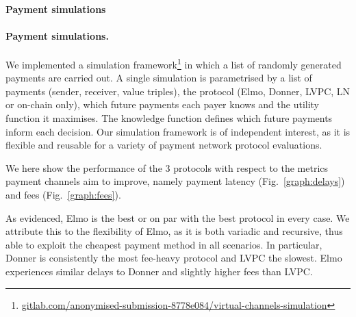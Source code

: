   \makeatletter%
    {\paragraph{Payment simulations}}%
    {\paragraph{Payment simulations.}}%
  \makeatother%
  We implemented a simulation
  framework\footnote{\url{gitlab.com/anonymised-submission-8778e084/virtual-channels-simulation}}
  in which a list of randomly generated payments are carried out.
  A single simulation is parametrised by a list of payments
  (sender, receiver, value triples), the protocol (Elmo, Donner, LVPC, LN or
  on-chain only), which future payments each payer knows and the utility
  function it maximises. The knowledge function defines which future payments
  inform each decision.
  Our simulation framework is of independent interest, as it is flexible
  and reusable for a variety of payment network protocol evaluations.

  We here
  show the performance of the $3$ protocols with respect to the metrics payment
  channels aim to improve, namely payment latency (Fig.~\ref{graph:delays}) and
  fees (Fig.~\ref{graph:fees}).

  As evidenced, Elmo is the best or on par with the best protocol in every
  case. We attribute this to the flexibility of Elmo, as it is both variadic and
  recursive, thus able to exploit the cheapest payment method in all scenarios.
  In particular, Donner is consistently the most fee-heavy protocol and LVPC the
  slowest. Elmo experiences similar delays to Donner and slightly higher fees
  than LVPC.

